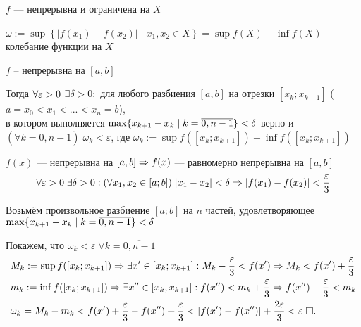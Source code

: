 \documentclass{article}
\begin{document}


$f$ --- непрерывна и ограничена на $X$

$\omega := \sup\left\{|f(x_1)-f(x_2)|\;\big|\;x_1,x_2\in X\right\}=\sup f(X)- \inf f(X)$ --- колебание функции на $X$


$f$ -- непрерывна на $[a,b]$

Тогда $\forall \varepsilon>0$ $\exists \delta > 0:$ для любого разбиения $[a,b]$ на отрезки $[x_{k};x_{k+1}]$ ($a = x_0<x_1<...<x_n = b$),\\
в котором выполняется $\max\{x_{k+1}-x_{k}\;|\;k=\overline{0,n-1}\} < \delta$ верно и $(\forall k=\overline{0,n-1})\;\omega_k < \varepsilon$,
где $\omega_k:=\sup f([x_{k};x_{k+1}])-\inf f([x_{k};x_{k+1}])$

\proof

$f(x)$ --- непрерывна на $[a,b] \Rightarrow f(x)$ --- равномерно непрерывна на $[a,b]$
\begin{align*}
	\forall\varepsilon>0\;\exists\delta>0:(\forall x_1,x_2\in[a;b])\;|x_1-x_2|<\delta\Rightarrow |f(x_1)-f(x_2)|<\frac{\varepsilon}{3}
\end{align*}

Возьмём произвольное разбиение $[a;b]$ на $n$ частей, удовлетворяющее $\max\{x_{k+1}-x_{k}\;|\;k=\overline{0,n-1}\}<\delta$

Покажем, что $\omega_k < \varepsilon\;\forall k = \overline{0,n-1}$
\begin{align*}
	 & M_{k}:=\sup f([x_{k};x_{k+1}])\Rightarrow\exists x'\in[x_{k};x_{k+1}]:M_{k}-\frac{\varepsilon}{3}<f(x')\Rightarrow M_{k}<f(x')+\frac{\varepsilon}{3}        \\
	 & m_{k}:=\inf f([x_{k};x_{k+1}])\Rightarrow\exists x''\in[x_k, x_{k+1}]:f(x'')<m_{k}+\frac{\varepsilon}{3}\Rightarrow f(x'')-\frac{\varepsilon}{3}<m_k \\
	 & \omega_k = M_k - m_k < f(x') + \frac{\varepsilon}{3} - f(x'') + \frac{\varepsilon}{3} < |f(x') - f(x'')| + \frac{2\varepsilon}{3} < \varepsilon \;\square.
\end{align*}
\end{document}
